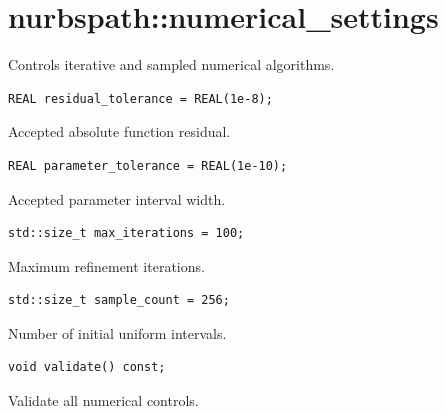 \section{nurbspath::numerical\_settings}
Controls iterative and sampled numerical algorithms.
\par\noindent\begin{minipage}{\linewidth}
\begin{lstlisting}[style=apireference]
REAL residual_tolerance = REAL(1e-8);
\end{lstlisting}
{\footnotesize Accepted absolute function residual.\par}
\end{minipage}\par\vspace{1pt}
\par\noindent\begin{minipage}{\linewidth}
\begin{lstlisting}[style=apireference]
REAL parameter_tolerance = REAL(1e-10);
\end{lstlisting}
{\footnotesize Accepted parameter interval width.\par}
\end{minipage}\par\vspace{1pt}
\par\noindent\begin{minipage}{\linewidth}
\begin{lstlisting}[style=apireference]
std::size_t max_iterations = 100;
\end{lstlisting}
{\footnotesize Maximum refinement iterations.\par}
\end{minipage}\par\vspace{1pt}
\par\noindent\begin{minipage}{\linewidth}
\begin{lstlisting}[style=apireference]
std::size_t sample_count = 256;
\end{lstlisting}
{\footnotesize Number of initial uniform intervals.\par}
\end{minipage}\par\vspace{1pt}
\par\noindent\begin{minipage}{\linewidth}
\begin{lstlisting}[style=apireference]
void validate() const;
\end{lstlisting}
{\footnotesize Validate all numerical controls.\par}
\end{minipage}\par\vspace{1pt}
